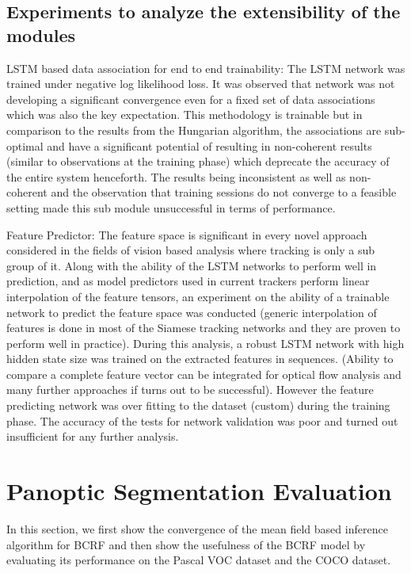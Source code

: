 \subsection{Experiments to analyze the extensibility of the modules}

LSTM based data association for end to end trainability: The LSTM network was trained under negative log likelihood loss. It was observed that network was not developing a significant convergence even for a fixed set of data associations which was also the key expectation. This methodology is trainable but in comparison to the results from the Hungarian algorithm, the associations are sub-optimal and have a significant potential of resulting in non-coherent results (similar to observations at the training phase) which deprecate the accuracy of the entire system henceforth. The results being inconsistent as well as non-coherent and the observation that training sessions do not converge to a feasible setting made this sub module unsuccessful in terms of performance.

Feature Predictor: The feature space is significant in every novel approach considered in the fields of vision based analysis where tracking is only a sub group of it. Along with the ability of the LSTM networks to perform well in prediction, and as model predictors used in current trackers perform linear interpolation of the feature tensors, an experiment on the ability of a trainable network to predict the feature space was conducted (generic interpolation of features is done in most of the Siamese tracking networks and they are proven to perform well in practice).
During this analysis, a robust LSTM network with high hidden state size was trained on the extracted features in sequences. (Ability to compare a complete feature vector can be integrated for optical flow analysis and many further approaches if turns out to be successful). However the feature predicting network was over fitting to the dataset (custom) during the training phase. The accuracy of the tests for network validation was poor and turned out insufficient for any further analysis.


\section{Panoptic Segmentation Evaluation}

In this section, we first show the convergence of the mean field based inference algorithm for BCRF and then show the usefulness of the BCRF model by evaluating its performance on the Pascal VOC dataset and the COCO dataset.

